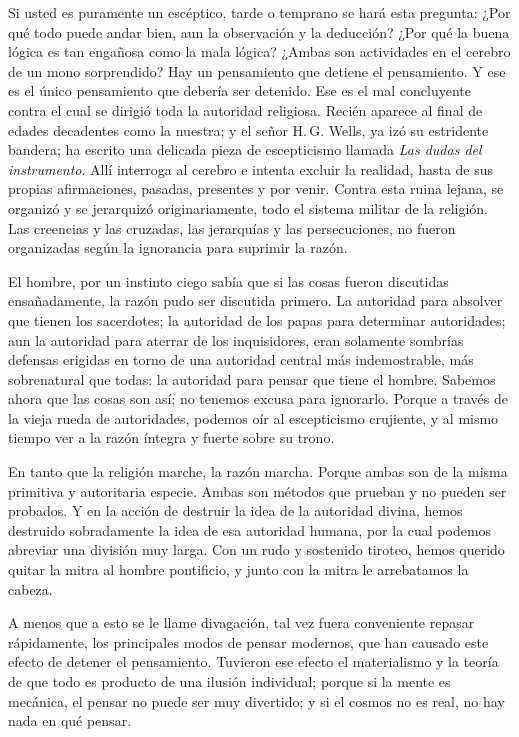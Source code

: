 Si usted es puramente un escéptico, tarde o temprano se hará esta pregunta: ¿Por qué todo puede
andar bien, aun la observación y la deducción? ¿Por qué la buena lógica es tan engañosa como la mala
lógica? ¿Ambas son actividades en el cerebro de un mono sorprendido?
Hay un pensamiento que detiene el pensamiento. Y ese es el único pensamiento que debería ser
detenido. Ese es el mal concluyente contra el cual se dirigió toda la autoridad religiosa. Recién aparece al
final de edades decadentes como la nuestra; y el señor H.\,G. Wells, ya izó su estridente bandera; ha
escrito una delicada pieza de escepticismo llamada \emph{Las dudas del instrumento}. Allí interroga al cerebro
e intenta excluir la realidad, hasta de sus propias afirmaciones, pasadas, presentes y por venir. Contra esta
ruina lejana, se organizó y se jerarquizó originariamente, todo el sistema militar de la religión. Las
creencias y las cruzadas, las jerarquías y las persecuciones, no fueron organizadas según la ignorancia para suprimir la razón.

El hombre, por un instinto ciego sabía que si las cosas fueron discutidas
ensañadamente, la razón pudo ser discutida primero. La autoridad para absolver que tienen los sacerdotes;
la autoridad de los papas para determinar autoridades; aun la autoridad para aterrar de los inquisidores,
eran solamente sombrías defensas erigidas en torno de una autoridad central más indemostrable, más
sobrenatural que todas: la autoridad para pensar que tiene el hombre. Sabemos ahora que las cosas son
así; no tenemos excusa para ignorarlo. Porque a través de la vieja rueda de autoridades, podemos oír al
escepticismo crujiente, y al mismo tiempo ver a la razón íntegra y fuerte sobre su trono.

En tanto que la religión marche, la razón marcha. Porque ambas son de la misma primitiva y
autoritaria especie. Ambas son métodos que prueban y no pueden ser probados. Y en la acción de destruir
la idea de la autoridad divina, hemos destruido sobradamente la idea de esa autoridad humana, por la cual
podemos abreviar una división muy larga. Con un rudo y sostenido tiroteo, hemos querido quitar la mitra
al hombre pontificio, y junto con la mitra le arrebatamos la cabeza.

A menos que a esto se le llame divagación, tal vez fuera conveniente repasar rápidamente, los
principales modos de pensar modernos, que han causado este efecto de detener el pensamiento. Tuvieron
ese efecto el materialismo y la teoría de que todo es producto de una ilusión individual; porque si la mente
es mecánica, el pensar no puede ser muy divertido; y si el cosmos no es real, no hay nada en qué pensar.

